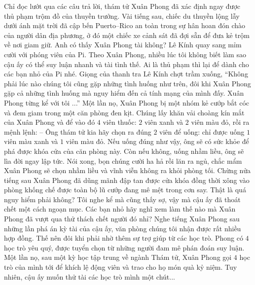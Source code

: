 	\vskip 0.1cm
	Chỉ đọc lướt qua các câu trả lời, thám tử Xuân Phong đã xác định ngay được thủ phạm trộm đồ của thuyền trưởng. Vài tiếng sau, chiếc du thuyền lộng lẫy dưới ánh mặt trời đã cập bến Puerto--Rico an toàn trong sự hân hoan đón chào của người dân địa phương, ở đó một chiếc xe cảnh sát đã đợi sẵn để đưa kẻ trộm về nơi giam giữ. 
	\vskip 0.1cm
	Anh có thấy Xuân Phong tài không? Lê Kính quay sang mỉm cười với phóng viên của Pi. Theo Xuân Phong, nhiều lúc tôi không biết làm sao cậu ấy có thể suy luận nhanh và tài tình thế. Ai là thủ phạm thì lại để dành cho các bạn nhỏ của Pi nhé.
	\vskip 0.1cm
	Giọng của thanh tra Lê Kính chợt trầm xuống, “Không phải lúc nào chúng tôi cũng gặp những tình huống như trên, đôi khi Xuân Phong gặp cả những tình huống mà nguy hiểm đến cả tính mạng của mình đấy. Xuân Phong từng kể với tôi ...”
	\vskip 0.1cm
	\textbf{\color{toancuabi}{Thử thách sống còn}}
	\vskip 0.1cm 
	Một lần nọ, Xuân Phong bị một nhóm kẻ cướp bắt cóc và đem giam trong một căn phòng đen kịt. Chúng lấy khăn vải choàng kín mắt của Xuân Phong và để vào đó $4$ viên thuốc: $2$ viên xanh và $2$ viên màu đỏ, rồi ra mệnh lệnh:
	\vskip 0.1cm
	--	Ông thám tử kia hãy chọn ra đúng $2$ viên để uống: chỉ được uống $1$ viên màu xanh và $1$ viên màu đỏ. Nếu uống đúng như vậy, ông sẽ có sức khỏe để phá được khóa cửa của căn phòng này. Còn nếu không, uống nhầm liều, ông sẽ lìa đời ngay lập tức. 
	\vskip 0.1cm
	Nói xong, bọn chúng cười ha hả rồi lăn ra ngủ, chắc mẩm Xuân Phong sẽ chọn nhầm liều và vĩnh viễn không ra khỏi phòng tối. Chừng nửa tiếng sau Xuân Phong đã dũng mãnh đập tan được cửa khóa đồng thời xông vào phòng khống chế được toàn bộ lũ cướp đang mê mệt trong cơn say. 
	\vskip 0.1cm
	Thật là quá nguy hiểm phải không? Tôi nghe kể mà cũng thấy sợ, vậy mà cậu ấy đã thoát chết một cách ngoạn mục. Các bạn nhỏ hãy nghĩ xem làm thế nào mà Xuân Phong đã vượt qua thử thách chết người đó nhỉ? 
	\vskip 0.1cm
	Nghe tiếng Xuân Phong sau những lần phá án kỳ tài của cậu ấy, văn phòng chúng tôi nhận được rất nhiều hợp đồng. Thế nên đôi khi phải nhờ thêm sự trợ giúp từ các học trò. Phong có $4$ học trò yêu quý, được tuyển chọn từ những người đam mê phán đoán suy luận. Một lần nọ, sau một kỳ học tập trung về ngành Thám tử, Xuân Phong gọi $4$ học trò của mình tới để khích lệ động viên và trao cho họ món quà kỷ niệm. Tuy nhiên, cậu ấy muốn thử tài các học trò mình một chút...
